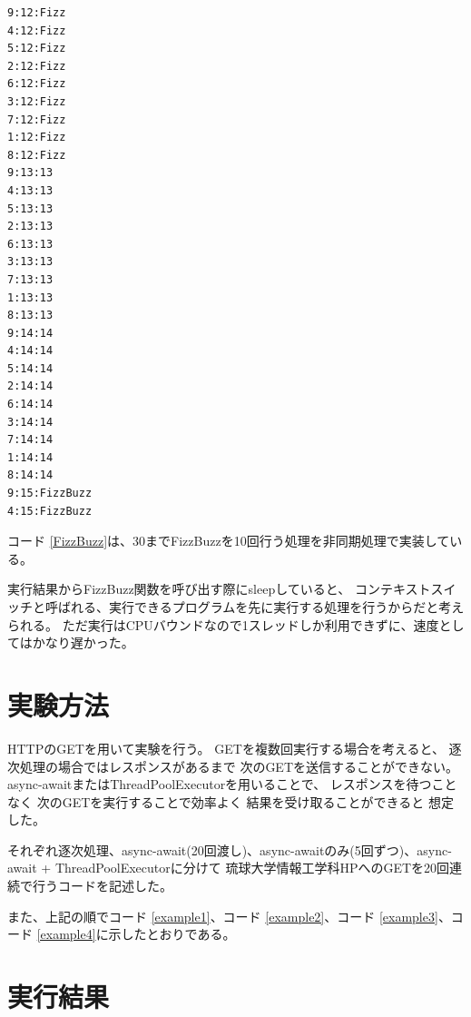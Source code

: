\documentclass[14pt, oneside]{article}     	%
\begin{document}


\begin{lstlisting}[caption=FizzBuzz実行結果]
9:12:Fizz
4:12:Fizz
5:12:Fizz
2:12:Fizz
6:12:Fizz
3:12:Fizz
7:12:Fizz
1:12:Fizz
8:12:Fizz
9:13:13
4:13:13
5:13:13
2:13:13
6:13:13
3:13:13
7:13:13
1:13:13
8:13:13
9:14:14
4:14:14
5:14:14
2:14:14
6:14:14
3:14:14
7:14:14
1:14:14
8:14:14
9:15:FizzBuzz
4:15:FizzBuzz
\end{lstlisting}

コード \ref{FizzBuzz}は、30までFizzBuzzを10回行う処理を非同期処理で実装している。

実行結果からFizzBuzz関数を呼び出す際にsleepしていると、
コンテキストスイッチと呼ばれる、実行できるプログラムを先に実行する処理を行うからだと考えられる。
ただ実行はCPUバウンドなので1スレッドしか利用できずに、速度としてはかなり遅かった。


\section{実験方法}

HTTPのGETを用いて実験を行う。
GETを複数回実行する場合を考えると、
逐次処理の場合ではレスポンスがあるまで
次のGETを送信することができない。
async-awaitまたはThreadPoolExecutorを用いることで、
レスポンスを待つことなく
次のGETを実行することで効率よく
結果を受け取ることができると
想定した。

それぞれ逐次処理、async-await(20回渡し)、async-awaitのみ(5回ずつ)、async-await + ThreadPoolExecutorに分けて
琉球大学情報工学科HPへのGETを20回連続で行うコードを記述した。

また、上記の順でコード \ref{example1}、コード \ref{example2}、コード \ref{example3}、コード \ref{example4}に示したとおりである。












\section{実行結果}
\end{document}
